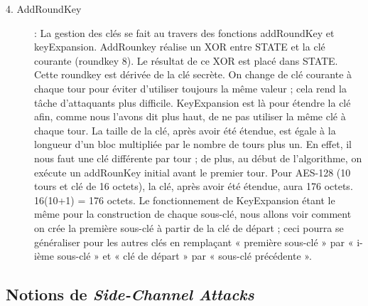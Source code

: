 \documentclass[10pt, oneside, a4paper]{article}
\begin{document}
\begin{description}
\item[4. AddRoundKey] :  La gestion des clés se fait au travers des fonctions addRoundKey et keyExpansion. AddRounkey réalise un XOR entre STATE et la clé courante (roundkey 8). Le résultat de ce XOR est placé dans STATE. Cette roundkey est dérivée de la clé secrète. On change de clé courante à chaque tour pour éviter d’utiliser toujours la même valeur ; cela rend la tâche d’attaquants plus difficile. KeyExpansion est là pour étendre la clé afin, comme nous l’avons dit plus haut, de ne pas utiliser la même clé à chaque tour. La taille de la clé, après avoir été étendue, est égale à la longueur d’un bloc multipliée par le nombre de tours plus un. En effet, il nous faut une clé différente par tour ; de plus, au début de l’algorithme, on exécute un addRounKey initial avant le premier tour. Pour AES-128 (10 tours et clé de 16 octets), la clé, après avoir été étendue, aura 176 octets. 16(10+1) = 176 octets. Le fonctionnement de KeyExpansion étant le même pour la construction de chaque sous-clé, nous allons voir comment on crée la première sous-clé à partir de la clé de départ ; ceci pourra se généraliser pour les autres clés en remplaçant « première sous-clé » par « i-ième sous-clé » et « clé de départ » par « sous-clé précédente ».
\end{description}


\newpage

\subsection{Notions de \textit{Side-Channel Attacks}}
\end{document}

